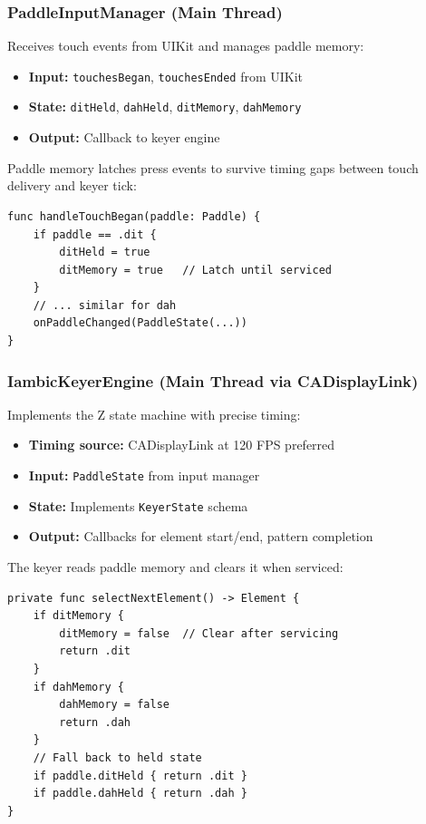\documentclass[a4paper,10pt,fleqn]{article}
\begin{document}
\subsubsection{PaddleInputManager (Main Thread)}

Receives touch events from UIKit and manages paddle memory:

\begin{itemize}
\item \textbf{Input:} \texttt{touchesBegan}, \texttt{touchesEnded} from UIKit
\item \textbf{State:} \texttt{ditHeld}, \texttt{dahHeld}, \texttt{ditMemory}, \texttt{dahMemory}
\item \textbf{Output:} Callback to keyer engine
\end{itemize}

Paddle memory latches press events to survive timing gaps between touch delivery
and keyer tick:

\begin{verbatim}
func handleTouchBegan(paddle: Paddle) {
    if paddle == .dit {
        ditHeld = true
        ditMemory = true   // Latch until serviced
    }
    // ... similar for dah
    onPaddleChanged(PaddleState(...))
}
\end{verbatim}

\subsubsection{IambicKeyerEngine (Main Thread via CADisplayLink)}

Implements the Z state machine with precise timing:

\begin{itemize}
\item \textbf{Timing source:} CADisplayLink at 120 FPS preferred
\item \textbf{Input:} \texttt{PaddleState} from input manager
\item \textbf{State:} Implements \texttt{KeyerState} schema
\item \textbf{Output:} Callbacks for element start/end, pattern completion
\end{itemize}

The keyer reads paddle memory and clears it when serviced:

\begin{verbatim}
private func selectNextElement() -> Element {
    if ditMemory {
        ditMemory = false  // Clear after servicing
        return .dit
    }
    if dahMemory {
        dahMemory = false
        return .dah
    }
    // Fall back to held state
    if paddle.ditHeld { return .dit }
    if paddle.dahHeld { return .dah }
}
\end{verbatim}
\end{document}
